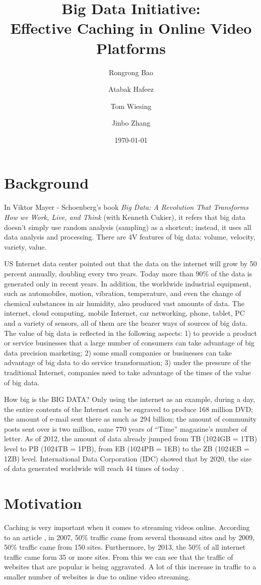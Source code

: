 \documentclass[a4paper,10pt]{article}
\title{Big Data Initiative:\\Effective Caching in Online Video Platforms}
\author{Rongrong Bao \and Atabak Hafeez \and Tom Wiesing \and Jinbo Zhang}
\date{\today}
\begin{document}
\maketitle

\section{Background}

In Viktor Mayer - Schoenberg’s book \textit{Big Data: A Revolution That Transforms How we Work, Live, and Think} (with Kenneth Cukier), it refers that big data doesn't simply use random analysis (sampling) as a shortcut; instead, it uses all data analysis and processing. There are 4V features of big data: volume, velocity, variety, value.

US Internet data center pointed out that the data on the internet will grow by 50 percent annually, doubling every two years. Today more than 90\% of the data is generated only in recent years. In addition, the worldwide industrial equipment, such as automobiles, motion, vibration, temperature, and even the change of chemical substances in air humidity, also produced vast amounts of data. The internet, cloud computing, mobile Internet, car networking, phone, tablet, PC and a variety of sensors, all of them are the bearer ways of sources of big data. The value of big data is reflected in the following aspects: 1) to provide a product or service businesses that a large number of consumers can take advantage of big data precision marketing; 2) some small companies or businesses can take advantage of big data to do service transformation; 3) under the pressure of the traditional Internet, companies need to take advantage of the times of the value of big data.

How big is the BIG DATA? Only using the internet as an example, during a day, the entire contents of the Internet can be engraved to produce 168 million DVD; the amount of e-mail sent there as much as 294 billion; the amount of community posts sent over is two million, same 770 years of ``Time'' magazine’s number of letter. As of 2012, the amount of data already jumped from TB (1024GB = 1TB) level to PB (1024TB = 1PB), from EB (1024PB = 1EB) to the ZB (1024EB = 1ZB) level. International Data Corporation (IDC) showed that by 2020, the size of data generated worldwide will reach 44 times of today .

\section{Motivation}
Caching is very important when it comes to streaming videos online. According to an article \cite{OnlineVideoBandwagon}, in 2007, 50\% traffic came from several thousand sites and by 2009, 50\% traffic came from 150 sites. Furthermore, by 2013, the 50\% of all internet traffic came form 35 or more sites. From this we can see that the traffic of websites that are popular is being aggravated. A lot of this increase in traffic to a smaller number of websites is due to online video streaming.
\end{document}
